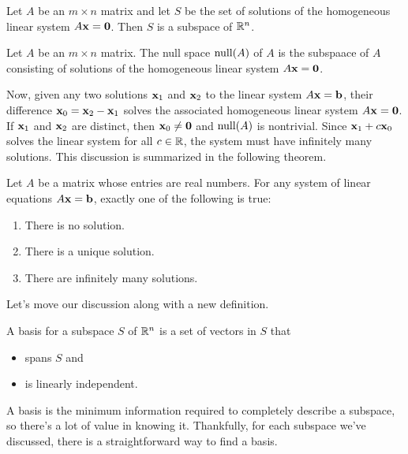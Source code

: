 \documentclass[../m73main.tex]{chapters}
\begin{document}
\begin{theorem}
	Let $A$ be an $m\times n$ matrix and let $S$ be the set of solutions of the homogeneous linear system $A\mathbf{x} = \mathbf{0}$.
	Then $S$ is a subspace of $\mathbb{R}^n$.
\end{theorem}

\begin{definition}
	Let $A$ be an $m\times n$ matrix.
	The null space $\textrm{null}(A)$ of $A$ is the subspaace of $A$ consisting of solutions of the homogeneous linear system $A\mathbf{x} = \mathbf{0}$.
\end{definition}

Now, given any two solutions $\mathbf{x}_1$ and $\mathbf{x}_2$ to the linear system $A\mathbf{x} = \mathbf{b}$, their difference $\mathbf{x}_0 = \mathbf{x}_2 - \mathbf{x}_1$ solves the associated homogeneous linear system $A\mathbf{x} = \mathbf{0}$.
If $\mathbf{x}_1$ and $\mathbf{x}_2$ are distinct, then $\mathbf{x}_0 \neq \mathbf{0}$ and $\textrm{null} (A)$ is nontrivial.
Since $\mathbf{x}_1 + c\mathbf{x}_0$ solves the linear system for all $c \in \mathbb{R}$, the system must have infinitely many solutions.
This discussion is summarized in the following theorem.

\begin{theorem}
	Let $A$ be a matrix whose entries are real numbers.
	For any system of linear equations $A\mathbf{x} = \mathbf{b}$, exactly one of the following is true:
	\begin{enumerate}[label=(\alph*)]
		\item There is no solution.
		\item There is a unique solution.
		\item There are infinitely many solutions.
	\end{enumerate}
\end{theorem}

Let's move our discussion along with a new definition.

\begin{definition}
	A basis for a subspace $S$ of $\mathbb{R}^n$ is a set of vectors in $S$ that
	\begin{itemize}
		\item spans $S$ and
		\item is linearly independent.
	\end{itemize}
\end{definition}

A basis is the minimum information required to completely describe a subspace, so there's a lot of value in knowing it.
Thankfully, for each subspace we've discussed, there is a straightforward way to find a basis.
\end{document}
